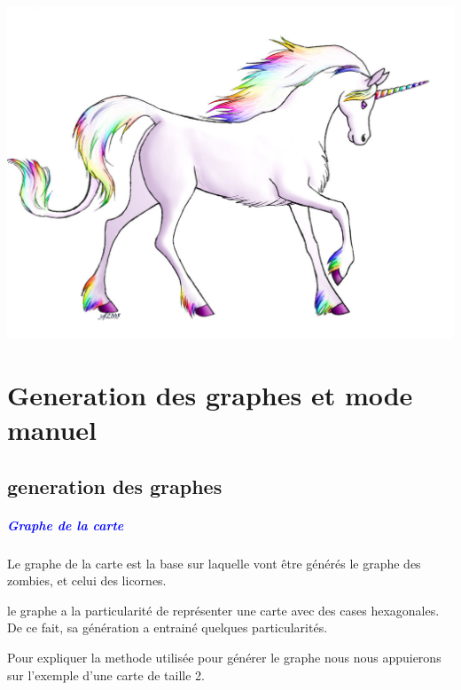 \documentclass{report}
\begin{document}
	\setcounter{tocdepth}{4}
	\tableofcontents
	
	\begin{center}
	\\[5cm]
	\includegraphics[scale=1]{Images/Licornes.jpg}
	\end{center}
	
	
	\chapter*{Generation des graphes et mode manuel}
		\section{generation des graphes}
			
			\paragraph{\textcolor{blue}{Graphe de la carte}}
			Le graphe de la carte est la base sur laquelle vont \^etre g\'en\'er\'es le graphe des zombies, et celui des licornes.
			
			le graphe a la particularit\'e de repr\'esenter une carte avec des cases hexagonales. De ce fait, sa g\'en\'eration a entrain\'e quelques particularit\'es.
			
			Pour expliquer la methode utilis\'ee pour g\'en\'erer le graphe nous nous appuierons sur l'exemple d'une carte de taille 2.
			
\end{document}
